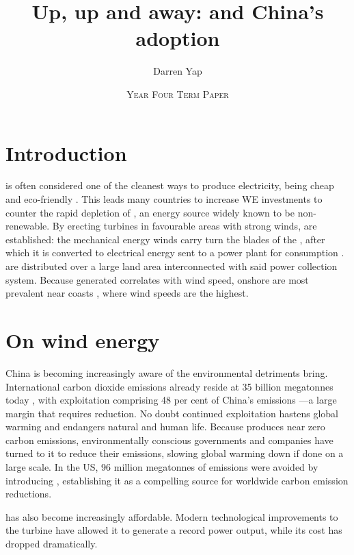 \documentclass[11pt, a4paper]{pancake-article}
\title{Up, up and away: \tint{Wind energy} and China's adoption}
\author{Darren Yap}
\date{\scshape Year Four Term Paper}
\begin{document}
\thispagestyle{empty}
\maketitle
\tableofcontents

\section{Introduction}
 is often considered one of the cleanest ways to produce
electricity, being cheap and eco-friendly \cite{premalatha_2014_wind}.
This leads many countries to increase WE investments to counter the
rapid depletion of , an energy source widely known
to be non-renewable.
By erecting turbines in favourable areas with strong winds, 
are established: the mechanical energy
winds carry turn the blades of the , after which
it is converted to electrical energy sent to a power plant for
consumption \cite{nejad_2022_wind}.  are distributed over a large
land area interconnected with said power collection system. Because
 generated correlates with wind speed, onshore
 are most
prevalent near coasts \cite{davis_2023_the}, where wind speeds are the highest.

\section{On wind energy}
China is becoming increasingly aware of the environmental detriments
 bring.
International carbon dioxide emissions already reside at 35 billion
megatonnes today \cite{trndle_2020_tradeoffs},
with  exploitation comprising 48 per cent of China's
emissions \cite{zhang_2012_large}---a
large margin that requires reduction.
No doubt continued  exploitation hastens global warming
and endangers
natural and human life. Because  produces near zero
carbon emissions,
environmentally conscious governments and companies have turned to it
to reduce their
emissions, slowing global warming down if done on a large scale.
In the US, 96 million megatonnes of emissions were avoided by
introducing  \cite{chen_2016_growing}, establishing it
as a compelling  source for worldwide carbon
emission reductions.

 has also become increasingly affordable. Modern technological
improvements to the turbine have allowed it to generate a record power
output, while its cost has dropped dramatically.

\printglossaries
\printbibliography[heading=bibintoc]
\end{document}
